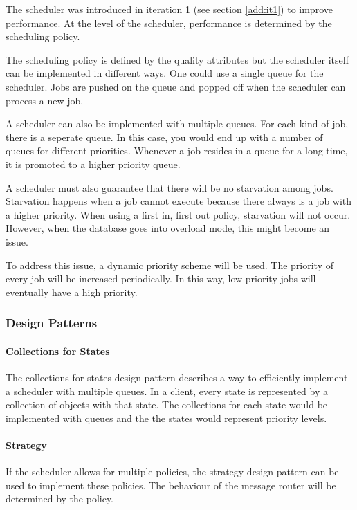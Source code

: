 \npar The scheduler was introduced in iteration 1 (see section \ref{add:it1}) to
improve performance. At the level of the scheduler, performance is determined by
the scheduling policy. 

\npar The scheduling policy is defined by the quality attributes but the
scheduler itself can be implemented in different ways. One could use a single
queue for the scheduler. Jobs are pushed on the queue and popped off when the
scheduler can process a new job. 

\npar A scheduler can also be implemented with multiple queues. For each kind of
job, there is a seperate queue. In this case, you would end up with a number of
queues for different priorities. Whenever a job resides in a queue for a long
time, it is promoted to a higher priority queue. 

\npar A scheduler must also guarantee that there will be no starvation among
jobs. Starvation happens when a job cannot execute because there always is a
job with a higher priority. When using a first in, first out policy, starvation
will not occur. However, when the database goes into overload mode, this might
become an issue. 

\npar To address this issue, a dynamic priority scheme will be used. The
priority of every job will be increased periodically. In this way, low priority
jobs will eventually have a high priority. 

\subsubsection{Design Patterns}
\label{add:it3/patterns}

\paragraph{Collections for States}

\npar The collections for states design pattern describes a way to efficiently
implement a scheduler with multiple queues. In a client, every state is
represented by a collection of objects with that state. The collections for
each state would be implemented with queues and the the states would represent
priority levels.

\paragraph{Strategy}

\npar If the scheduler allows for multiple policies, the strategy design pattern
can be used to implement these policies. The behaviour of the message router
will be determined by the policy.

